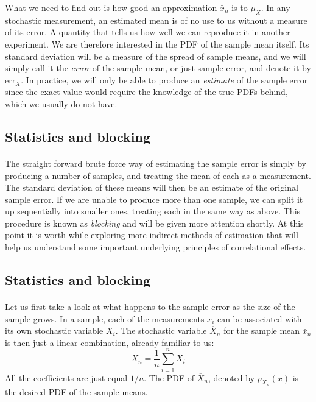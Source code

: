 \documentclass[%
twoside,                 %
final,                   %
10pt]{article}
\begin{document}
What we need to find out is how good an approximation $\bar{x}_n$ is to
$\mu_X^{\phantom X}$. In any stochastic measurement, an estimated
mean is of no use to us without a measure of its error. A quantity
that tells us how well we can reproduce it in another experiment. We
are therefore interested in the PDF of the sample mean itself. Its
standard deviation will be a measure of the spread of sample means,
and we will simply call it the \emph{error} of the sample mean, or
just sample error, and denote it by $\mathrm{err}_X^{\phantom X}$. In
practice, we will only be able to produce an \emph{estimate} of the
sample error since the exact value would require the knowledge of the
true PDFs behind, which we usually do not have.



\subsection{Statistics and blocking}

\paragraph{}
The straight forward brute force way of estimating the sample error is
simply by producing a number of samples, and treating the mean of each
as a measurement. The standard deviation of these means will then be
an estimate of the original sample error. If we are unable to produce
more than one sample, we can split it up sequentially into smaller
ones, treating each in the same way as above. This procedure is known
as \emph{blocking} and will be given more attention shortly. At this
point it is worth while exploring more indirect methods of estimation
that will help us understand some important underlying principles of
correlational effects.




\subsection{Statistics and blocking}

\paragraph{}
Let us first take a look at what happens to the sample error as the
size of the sample grows. In a sample, each of the measurements $x_i$
can be associated with its own stochastic variable $X_i$. The
stochastic variable $\overline X_n$ for the sample mean $\bar{x}_n$ is
then just a linear combination, already familiar to us:
\[
\overline X_n = \frac{1}{n}\sum_{i=1}^n X_i
\]
All the coefficients are just equal $1/n$. The PDF of $\overline X_n$,
denoted by $p_{\overline X_n}(x)$ is the desired PDF of the sample
means.
\end{document}
